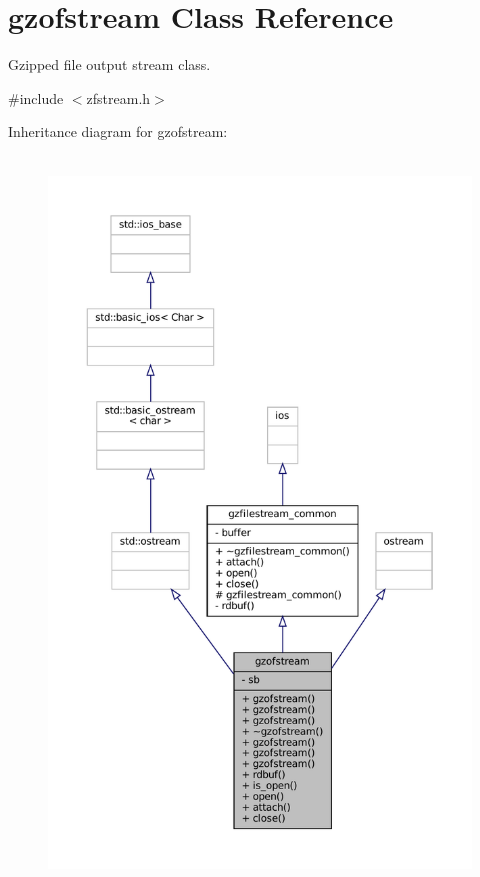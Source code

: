 \hypertarget{classgzofstream}{}\section{gzofstream Class Reference}
\label{classgzofstream}


Gzipped file output stream class.  




{\ttfamily \#include $<$zfstream.\+h$>$}



Inheritance diagram for gzofstream\+:
\nopagebreak
\begin{figure}[H]
\begin{center}
\leavevmode
\includegraphics[height=550pt]{classgzofstream__inherit__graph}
\end{center}
\end{figure}


